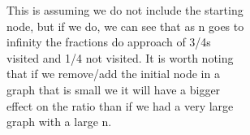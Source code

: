 \documentclass[12pt]{article}
\begin{document}
\begin{enumerate}
\begin{enumerate}
\begin{enumerate}
\begin{minipage}{0.6\textwidth}
This is assuming we do not include the starting \\
node, but if we do, we can see that as n goes to \\
infinity the fractions do approach of 3/4s \\
visited and 1/4 not visited. It is worth noting\\
that if we remove/add the initial node in a \\
graph that is small we it will have a bigger \\
effect on the ratio than if we had a very large \\
graph with a large n.

\end{minipage}
\noindent
\\

	\pagebreak
	

\end{enumerate}
\end{enumerate}
\end{enumerate}
\end{document}

